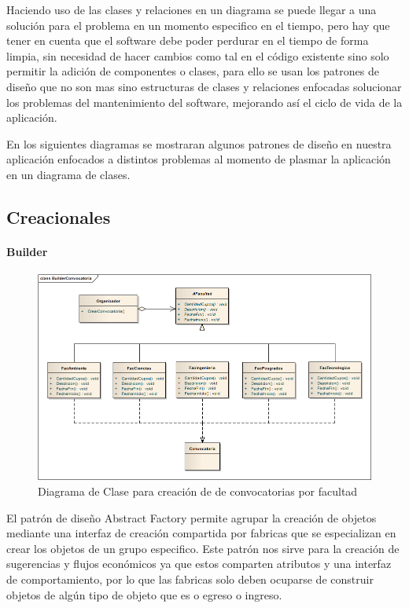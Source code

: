 Haciendo uso de las clases y relaciones en un diagrama se puede llegar a una solución para el problema en un momento especifico en el tiempo, pero hay que tener en cuenta que el software debe poder perdurar en el tiempo de forma limpia, sin necesidad de hacer cambios como tal en el código existente sino solo permitir la adición de componentes o clases, para ello se usan los patrones de diseño que no son mas sino estructuras de clases y relaciones enfocadas solucionar los problemas del mantenimiento del software, mejorando así el ciclo de vida de la aplicación.

En los siguientes diagramas se mostraran algunos patrones de diseño en nuestra aplicación enfocados a distintos problemas al momento de plasmar la aplicación en un diagrama de clases.

\subsection{Creacionales}

\paragraph{Builder}
\begin{figure}[H]
	\centering
	\includegraphics[width=1\linewidth]{parte2/imgs/Patrones/BuilderConvocatoria}
	\caption[Diagrama de clases del patrón Builder]{Diagrama de Clase para creación de de convocatorias por facultad}
	\label{fig:fabricaAbstracta}
\end{figure}

El patrón de diseño Abstract Factory permite agrupar la creación de objetos mediante una interfaz de creación compartida por fabricas que se especializan en crear los objetos de un grupo especifico. Este patrón nos sirve para la creación de sugerencias y flujos económicos ya que estos comparten atributos y una interfaz de comportamiento, por lo que las fabricas solo deben ocuparse de construir objetos de algún tipo de objeto que es o egreso o ingreso.

